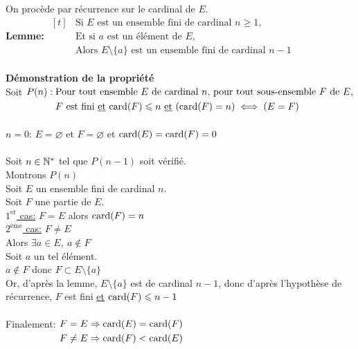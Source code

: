\documentclass[12pt,twoside,a4paper]{article}
\begin{document}
	\begin{preuve}
		On proc\`ede par r\'ecurrence sur le cardinal de $E$.\\
		\textbf{Lemme:}
		$\begin{aligned}[t]
			&\text{Si }E\text{ est un ensemble fini de cardinal }n\geqslant 1,\\
			&\text{Et si }a\text{ est un \'el\'ement de }E,\\
			&\text{Alors }E\setminus \{a\}\text{ est un ensemble fini de cardinal }n-1
		\end{aligned}$\\
		\\
		\textbf{D\'emonstration de la propri\'et\'e}\\
		Soit $P(n):
		\begin{aligned}[t]
			&\text{Pour tout ensemble }E\text{ de cardinal }n\text{, pour tout sous-ensemble }F\text{ de }E\text{,}\\
			&\text{}F\text{ est fini \underline{et} }\text{card}(F)\leqslant n\text{ \underline{et} }(\text{card}(F)=n)\iff(E=F)
		\end{aligned}$\\
		\\
		\underline{$n=0$}: $E=\varnothing$ et $F=\varnothing$ et $\text{card}(E)=\text{card}(F)=0$\\
		\\
		Soit $n\in\mathbb{N}^*$ tel que $P(n-1)$ soit v\'erifi\'e.\\
		Montrons $P(n)$\\
		Soit $E$ un ensemble fini de cardinal $n$.\\
		Soit $F$ une partie de $E$.\\
		\underline{$1^{\text{er}}$ cas:} $F=E$ alors $\text{card}(F)=n$\\
		\underline{$2^{\text{\`eme}}$ cas:} $F\neq E$\\
		Alors $\exists a\in E,\ a\notin F$\\
		Soit $a$ un tel \'el\'ement.\\
		$a\notin F$ donc $F\subset E\setminus\{a\}$\\
		Or, d'apr\`es la lemme, $E\setminus\{a\}$ est de cardinal $n-1$, donc d'apr\`es l'hypoth\`ese de r\'ecurrence, $F$ est fini \underline{et} $\text{card}(F)\leqslant n-1$\\
		\\
		Finalement: 
		$\begin{aligned}[t]
			& F=E\Rightarrow \text{card}(E)=\text{card}(F)\\
			& F\neq E\Rightarrow \text{card}(F)<\text{card}(E)
		\end{aligned}$\\

\end{preuve}
\end{document}
